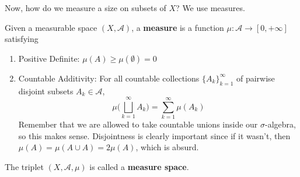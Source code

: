   Now, how do we measure a size on subsets of $X$? We use measures. 

  \begin{definition}[Measure]
    Given a measurable space $(X, \mathcal{A})$, a \textbf{measure} is a function $\mu : \mathcal{A} \longrightarrow [0, +\infty]$ satisfying 
    \begin{enumerate}
      \item Positive Definite: $\mu(A) \geq \mu(\emptyset) = 0$ 
      \item Countable Additivity: For all countable collections $\{A_k\}_{k=1}^\infty$ of pairwise disjoint subsets $A_k \in \mathcal{A}$, 
      \begin{equation}
        \mu \bigg( \bigsqcup_{k=1}^\infty A_k \bigg) = \sum_{k=1}^\infty \mu(A_k)
      \end{equation}
      Remember that we are allowed to take countable unions inside our $\sigma$-algebra, so this makes sense. Disjointness is clearly important since if it wasn't, then $\mu(A) = \mu(A \cup A) = 2 \mu(A)$, which is absurd. 
    \end{enumerate}
    The triplet $(X, \mathcal{A}, \mu)$ is called a \textbf{measure space}. 
  \end{definition}


